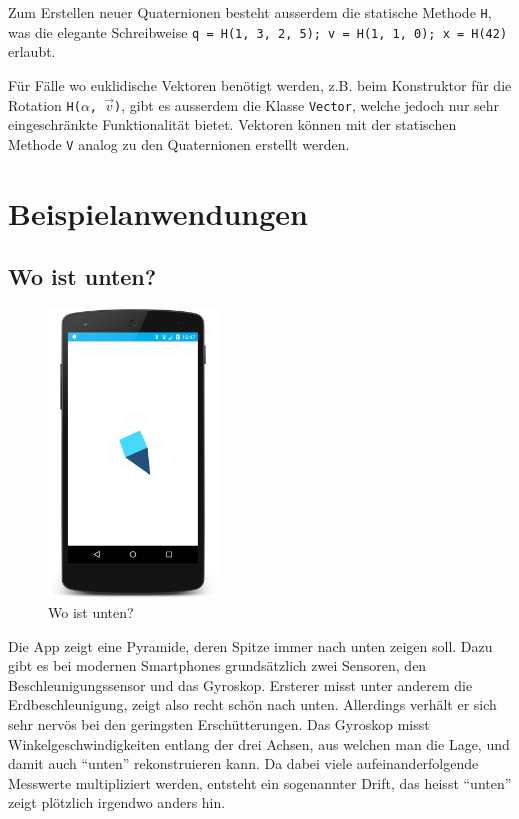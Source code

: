 \documentclass[12pt]{article}
\begin{document}
  Zum Erstellen neuer Quaternionen besteht ausserdem die statische Methode \texttt{H}, was die elegante Schreibweise \texttt{q = H(1, 3, 2, 5); v = H(1, 1, 0); x = H(42)} erlaubt. 

  Für Fälle wo euklidische Vektoren benötigt werden, z.B. beim Konstruktor für die Rotation \texttt{H($\alpha$, $\vec{v}$)}, gibt es ausserdem die Klasse \texttt{Vector}, welche jedoch nur sehr eingeschränkte Funktionalität bietet. Vektoren können mit der statischen Methode \texttt{V} analog zu den Quaternionen erstellt werden.

\newpage
  \section{Beispielanwendungen}
  \subsection{Wo ist unten?}

\begin{figure}
    \vspace{-12pt}
    \centering
    \includegraphics[width=0.4\textwidth]{down.png}
    \vspace{-18pt}
    \caption{Wo ist unten?}
    \label{fig:screenshot_down}
\end{figure}
  Die App zeigt eine Pyramide, deren Spitze immer nach unten zeigen soll. Dazu gibt es bei modernen Smartphones grundsätzlich zwei Sensoren, den Beschleunigungssensor und das Gyroskop. Ersterer misst unter anderem die Erdbeschleunigung, zeigt also recht schön nach unten. Allerdings verhält er sich sehr nervös bei den geringsten Erschütterungen. Das Gyroskop misst Winkelgeschwindigkeiten entlang der drei Achsen, aus welchen man die Lage, und damit auch ``unten'' rekonstruieren kann. Da dabei viele aufeinanderfolgende Messwerte multipliziert werden, entsteht ein sogenannter Drift, das heisst ``unten'' zeigt plötzlich irgendwo anders hin.
\end{document}
